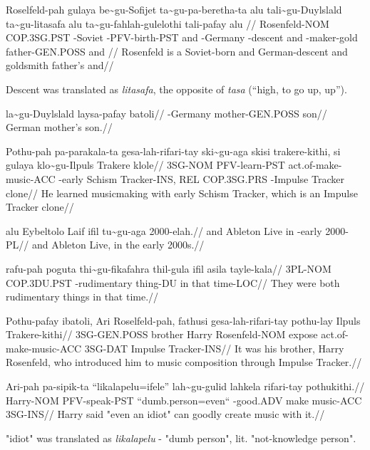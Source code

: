 \ex
\begingl
\gla  Roselfeld-pah gulaya      be\~{}gu-Sofijet ta\~{}gu-pa-beretha-ta alu tali\~{}gu-Duylslald ta\~{}gu-litasafa alu ta\~{}gu-fahlah-gulelothi tali-pafay      alu //
\glb  Rosenfeld-NOM COP.3SG.PST \agradj{}-Soviet \agradj{}-PFV-birth-PST and \agradj{}-Germany   \agradj{}-descent and \agradj{}-maker-gold      father-GEN.POSS and //
\glft Rosenfeld is a Soviet-born and German-descent and goldsmith father's and//
\endgl 
\xe


Descent was translated as \textit{litasafa}, the opposite of \textit{tasa} (``high, to go up, up'').

\ex
\begingl
\gla  la\~{}gu-Duylslald laysa-pafay batoli//
\glb  \agradj{}-Germany  mother-GEN.POSS son//
\glft German mother's son.//
\endgl
\xe

\ex
\begingl
\gla  Pothu-pah pa-parakala-ta gesa-lah-rifari-tay   ski\~{}gu-aga   skisi  trakere-kithi, si  gulaya      klo\~{}gu-Ilpuls  Trakere klole//
\glb  3SG-NOM   PFV-learn-PST  act.of-make-music-ACC \agradj{}-early Schism Tracker-INS,   REL COP.3SG.PRS \agradj{}-Impulse Tracker clone//
\glft He learned musicmaking with early Schism Tracker, which is an Impulse Tracker clone//
\endgl
\xe

\ex
\begingl
\gla  alu Eybeltolo Laif ifil tu\~{}gu-aga    2000-elah.//
\glb  and Ableton   Live in   \agradj{}-early 2000-PL//
\glft and Ableton Live, in the early 2000s.//
\endgl
\xe

\ex
\begingl
\gla  rafu-pah poguta      thi\~{}gu-fikafahra   thil-gula ifil asila tayle-kala//
\glb  3PL-NOM  COP.3DU.PST \agradj{}-rudimentary thing-DU  in   that  time-LOC//
\glft They were both rudimentary things in that time.//
\endgl
\xe

\ex
\begingl
\gla  Pothu-pafay  ibatoli, Ari   Roselfeld-pah, fathusi gesa-lah-rifari-tay   pothu-lay Ilpuls  Trakere-kithi//
\glb  3SG-GEN.POSS brother  Harry Rosenfeld-NOM  expose  act.of-make-music-ACC 3SG-DAT   Impulse Tracker-INS//
\glft It was his brother, Harry Rosenfeld, who introduced him to music composition through Impulse Tracker.//
\endgl
\xe

\ex
\begingl
\gla  Ari-pah   pa-sipik-ta   ``likalapelu=ifele'' lah\~{}gu-gulid    lahkela rifari-tay pothukithi.//
\glb  Harry-NOM PFV-speak-PST ``dumb.person=even`` \agradj{}-good.ADV make    music-ACC  3SG-INS//
\glft Harry said "even an idiot" can goodly create music with it.//
\endgl
\xe

"idiot" was translated as \textit{likalapelu} - "dumb person", lit. "not-knowledge person".

